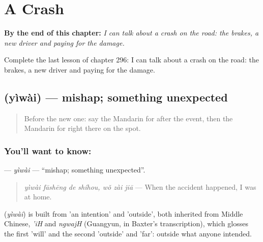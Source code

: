 
\chapter{A Crash}
\label{ch:zh-a-crash}

\begin{chapteropening}
\textbf{By the end of this chapter:} \emph{I can talk about a crash on the road: the brakes, a new driver and paying for the damage.}

Complete the last lesson of chapter 296: I can talk about a crash on the road: the brakes, a new driver and paying for the damage.
\end{chapteropening}

\section[\texorpdfstring{\zh{意外} (yìwài)}{意外 (yìwài)}]{ (yìwài) — mishap; something unexpected}

\label{lesson:ZH-C296-yiwai}



\begin{quote}
Before the new one: say the Mandarin for after the event, then the Mandarin for right there on the spot.
\end{quote}

\subsection*{You'll want to know: }
\textbf{} — \emph{yìwài} — \textquotedblleft{}mishap; something unexpected\textquotedblright{}.

\begin{quote}
\textbf{} \emph{yìwài fāshēng de shíhou, wǒ zài jiā} — When the accident happened, I was at home.
\end{quote}

\begin{cousinweb}
\textbf{} (\emph{yìwài}) is built from  'an intention' and  'outside', both inherited from Middle Chinese, \emph{'iH} and \emph{ngwajH} (Guangyun, in Baxter's transcription), which glosses the first 'will' and the second 'outside' and 'far': outside what anyone intended.
\end{cousinweb}

